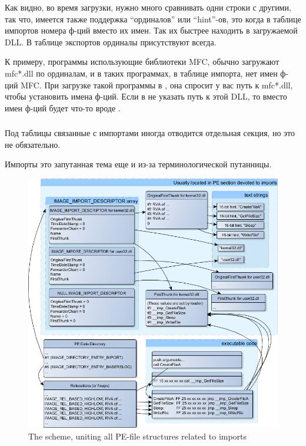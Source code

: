Как видно, во время загрузки, нужно много сравнивать одни строки с другими, так что, 
имеется также поддержка ``ординалов'' или 
``hint''-ов, это когда в таблице импортов номера ф-ций вместо их имен. Так их быстрее находить в загружаемой DLL.
В таблице экспортов ординалы присутствуют всегда.

К примеру, программы использующие библиотеки \ac{MFC}, обычно загружают mfc*.dll по ординалам, и в таких программах,
в таблице импорта, нет имен ф-ций \ac{MFC}. При загрузке такой программы в \IDA, она спросит у вас путь к mfc*.dll,
чтобы установить имена ф-ций. Если в \IDA не указать путь к этой DLL, то вместо имен ф-ций будет что-то вроде 
.

\subsubsection{}

Под таблицы связанные с импортами иногда отводится отдельная секция, но это не обязательно.

Импорты это запутанная тема еще и из-за терминологической путанницы.


\begin{figure}[ht!]
\centering
\includegraphics[scale=0.66]{PE/unnamed0.png}
\caption{
{The scheme, uniting all PE-file structures related to imports}}
\end{figure}

